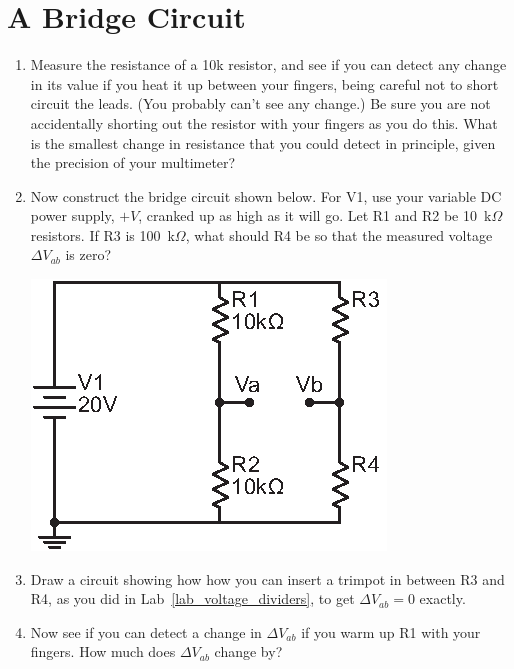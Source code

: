 \section{A Bridge Circuit}
\label{lab_bridge}


\bigskip

\begin{enumerate}[wide]

\item Measure the resistance of a 10k resistor, and see if you can detect any change in its value if you heat it up between your fingers, being careful not to short circuit the leads.  (You probably can't see any change.)  Be sure you are not accidentally shorting out the resistor with your fingers as you do this.  What is the smallest change in resistance that you could detect in principle, given the precision of your multimeter?

\item Now construct the bridge circuit shown below.  For V1, use your variable DC power supply, $+V$, cranked up as high as it will go.  Let R1 and R2 be 10~k$\Omega$ resistors.  If R3 is 100~k$\Omega$, what should R4 be so that the measured voltage $\Delta V_{ab}$ is zero?  


\begin{center}
\includegraphics{bridge_circuit/bridge.eps}
\end{center}


\item Draw a circuit showing how how you can insert a trimpot in between R3 and R4, as you did in Lab~\ref{lab_voltage_dividers}, to get $\Delta V_{ab} = 0$ exactly.
	
\item Now see if you can detect a change in $\Delta V_{ab}$ if you warm up R1 with your fingers.  How much does $\Delta V_{ab}$ change by?


\end{enumerate}
